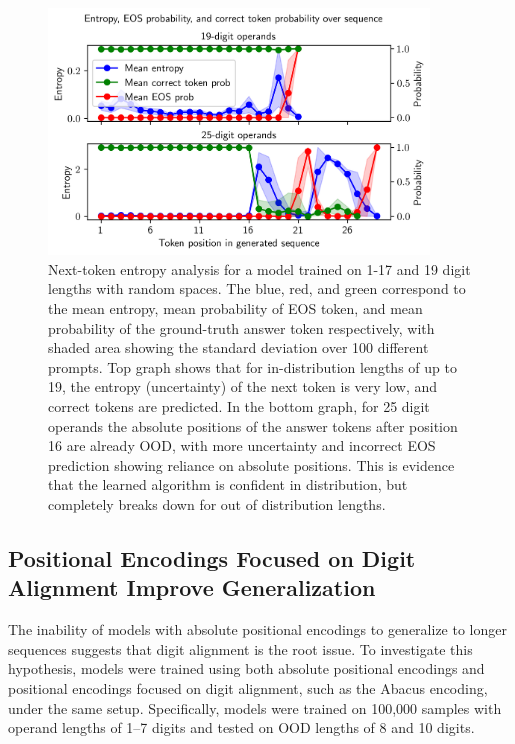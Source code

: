\begin{figure}[!h]
    \centering
    \includegraphics[width=0.9\textwidth]{fig/next_token_entropy.png}
    \caption{Next-token entropy analysis for a model trained on 1-17 and 19 digit lengths with random spaces. The blue, red, and green correspond to the mean entropy, mean probability of EOS token, and mean probability of the ground-truth answer token respectively, with shaded area showing the standard deviation over 100 different prompts. Top graph shows that for in-distribution lengths of up to 19, the entropy (uncertainty) of the next token is very low, and correct tokens are predicted. In the bottom graph, for 25 digit operands the absolute positions of the answer tokens after position 16 are already OOD, with more uncertainty and incorrect EOS prediction showing reliance on absolute positions. This is evidence that the learned algorithm is confident in distribution, but completely breaks down for out of distribution lengths.}
    \label{fig:next_token_entropy}
\end{figure}

\subsection{Positional Encodings Focused on Digit Alignment Improve Generalization}\label{subsec:digit_alignment_pe}

The inability of models with absolute positional encodings to generalize to longer sequences suggests that digit alignment is the root issue. To investigate this hypothesis, models were trained using both absolute positional encodings and positional encodings focused on digit alignment, such as the Abacus encoding, under the same setup. Specifically, models were trained on 100,000 samples with operand lengths of 1--7 digits and tested on OOD lengths of 8 and 10 digits.

